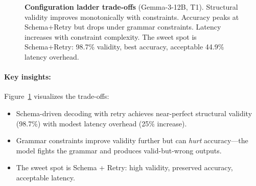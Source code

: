 \documentclass[11pt]{article}
\begin{document}
\begin{figure}[t]
\centering
{}
\caption{\textbf{Configuration ladder trade-offs} (Gemma-3-12B, T1). Structural validity improves monotonically with constraints. Accuracy peaks at Schema+Retry but drops under grammar constraints. Latency increases with constraint complexity. The sweet spot is Schema+Retry: 98.7\% validity, best accuracy, acceptable 44.9\% latency overhead.}
\label{fig:config-ladder-chart}
\end{figure}

\paragraph{Key insights:}
Figure~\ref{fig:config-ladder-chart} visualizes the trade-offs:
\begin{itemize}[leftmargin=12pt]
    \item Schema-driven decoding with retry achieves near-perfect structural validity (98.7\%) with modest latency overhead (25\% increase).
    \item Grammar constraints improve validity further but can \emph{hurt} accuracy---the model fights the grammar and produces valid-but-wrong outputs.
    \item The sweet spot is Schema + Retry: high validity, preserved accuracy, acceptable latency.
\end{itemize}
\end{document}
